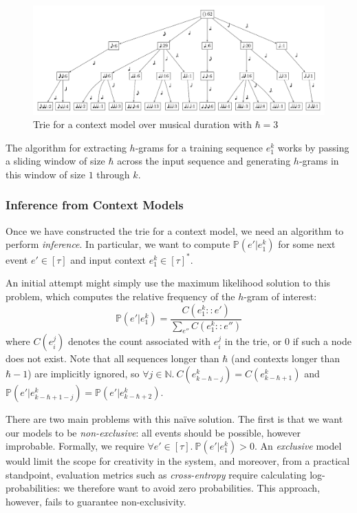 \documentclass[12pt,a4paper,twoside,openright]{report}
\begin{document}
\begin{figure}[H]
\centering
\includegraphics[width=455pt]{figs/duration_vp.pdf}
\caption{Trie for a context model over musical duration with $\hbar = 3$}
\label{fig:dur-trie}
\end{figure}

The algorithm for extracting $h$-grams for a training sequence $e_1^k$ works by
passing a sliding window of size $\hbar$ across the input sequence and
generating $h$-grams in this window of size $1$ through $k$. 

\subsubsection{Inference from Context Models}

Once we have constructed the trie for a context model, we need an algorithm to
perform \emph{inference}. In particular, we want to compute $\mathbb{P}(e' |
e_1^k)$ for some next event $e' \in [\tau]$ and input context $e_1^k \in
[\tau]^*$.

An initial attempt might simply use the maximum likelihood solution to this
problem, which computes the relative frequency of the $h$-gram of interest:
\begin{equation}
  \mathbb{P}(e'|e_1^k) = \frac{ C(e_1^k::e') }{ \sum_{e''} C(e_1^k::e'') }
  \label{eq:ctx-max-like}
\end{equation}
where $C(e_i^j)$ denotes the count associated with $e_i^j$ in the trie, or $0$
if such a node does not exist. Note that all sequences longer than $\hbar$ (and
contexts longer than $\hbar-1$) are implicitly ignored, so $\forall j \in
\mathbb{N}.\ C(e_{k-\hbar-j}^k) = C(e_{k-\hbar+1}^k)$ and
$\mathbb{P}(e'|e_{k-\hbar+1-j}^k) = \mathbb{P}(e'|e_{k-\hbar+2}^k)$.

There are two main problems with this naïve solution. The first is that we want
our models to be \emph{non-exclusive}: all events should be possible, however
improbable. Formally, we require $\forall e' \in [\tau].\ \mathbb{P}(e' | e_1^k)
> 0$. An \emph{exclusive} model would limit the scope for creativity in the
system, and moreover, from a practical standpoint, evaluation metrics such as
\emph{cross-entropy} require calculating log-probabilities: we therefore want to
avoid zero probabilities. This approach, however, fails to guarantee
non-exclusivity.
\end{document}
